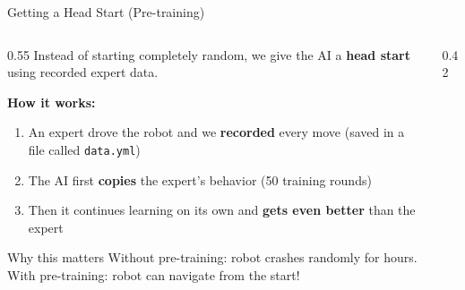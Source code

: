 \documentclass[aspectratio=169, 11pt]{beamer}
\begin{document}
\begin{frame}{Getting a Head Start (Pre-training)}

  \begin{columns}[T]
    \begin{column}{0.55\textwidth}
      Instead of starting completely random, we give the AI
      a \textbf{head start} using recorded expert data.

      \vspace{0.4em}
      \textbf{How it works:}
      \begin{enumerate}\small
        \item An expert drove the robot and we \textbf{recorded}
              every move (saved in a file called \texttt{data.yml})
        \item The AI first \textbf{copies} the expert's behavior
              (50 training rounds)
        \item Then it continues learning on its own and
              \textbf{gets even better} than the expert
      \end{enumerate}

      \vspace{0.3em}
      \begin{alertblock}{Why this matters}
        \small Without pre-training: robot crashes randomly for hours.\\
        With pre-training: robot can navigate from the start!
      \end{alertblock}
    \end{column}

    \begin{column}{0.42\textwidth}
      \centering
    \end{column}
  \end{columns}
\end{frame}
\end{document}
